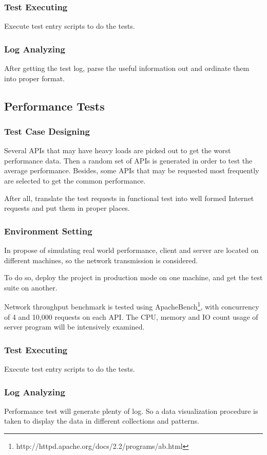     \subsubsection{Test Executing}
      Execute test entry scripts to do the tests.
    \subsubsection{Log Analyzing}
      After getting the test log, parse the useful information out and ordinate them into proper format.
  \subsection{Performance Tests}
    \subsubsection{Test Case Designing}
      Several APIs that may have heavy loads are picked out to get the worst performance data.
      Then a random set of APIs is generated in order to test the average performance.
      Besides, some APIs that may be requested most frequently are selected to get the common performance.

      After all, translate the test requests in functional test into well formed Internet requests
      and put them in proper places.
    \subsubsection{Environment Setting}
      In propose of simulating real world performance,
	  client and server are located on different machines, so the network
	  transmission is considered.

	  To do so, deploy the project in production mode on one machine, and get
	  the test suite on another.

	  Network throughput benchmark is tested using ApacheBench\footnote{http://httpd.apache.org/docs/2.2/programs/ab.html}, with concurrency of 4 and 10,000 requests on each API.
	  The CPU, memory and IO count usage of server program will be intensively examined.

    \subsubsection{Test Executing}
      Execute test entry scripts to do the tests.
    \subsubsection{Log Analyzing}
      Performance test will generate plenty of log.
      So a data visualization procedure is taken to display the data in different collections and patterns.
